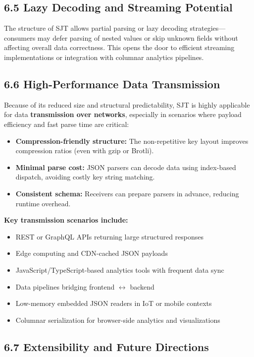 \documentclass[12pt]{article}
\begin{document}
\subsection*{6.5 Lazy Decoding and Streaming Potential}
The structure of SJT allows partial parsing or lazy decoding strategies---consumers may defer parsing of nested values or skip unknown fields without affecting overall data correctness. This opens the door to efficient streaming implementations or integration with columnar analytics pipelines.

\subsection*{6.6 High-Performance Data Transmission}
Because of its reduced size and structural predictability, SJT is highly applicable for data \textbf{transmission over networks}, especially in scenarios where payload efficiency and fast parse time are critical:

\begin{itemize}
  \item \textbf{Compression-friendly structure:} The non-repetitive key layout improves compression ratios (even with gzip or Brotli).
  \item \textbf{Minimal parse cost:} JSON parsers can decode data using index-based dispatch, avoiding costly key string matching.
  \item \textbf{Consistent schema:} Receivers can prepare parsers in advance, reducing runtime overhead.
\end{itemize}

\textbf{Key transmission scenarios include:}
\begin{itemize}
  \item REST or GraphQL APIs returning large structured responses
  \item Edge computing and CDN-cached JSON payloads
  \item JavaScript/TypeScript-based analytics tools with frequent data sync
  \item Data pipelines bridging frontend $\leftrightarrow$ backend
  \item Low-memory embedded JSON readers in IoT or mobile contexts
  \item Columnar serialization for browser-side analytics and visualizations
\end{itemize}

\subsection*{6.7 Extensibility and Future Directions}
\end{document}
